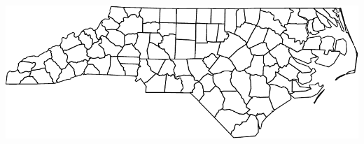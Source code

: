 \documentclass[11pt,ignorenonframetext,]{beamer}
\newenvironment{Shaded}{}{}
\newcommand{\KeywordTok}[1]{\textcolor[rgb]{0.00,0.44,0.13}{\textbf{#1}}}
\newcommand{\NormalTok}[1]{#1}
\newcommand{\OperatorTok}[1]{\textcolor[rgb]{0.40,0.40,0.40}{#1}}
\newcommand{\StringTok}[1]{\textcolor[rgb]{0.25,0.44,0.63}{#1}}
\let\oldShaded\Shaded
\let\endoldShaded\endShaded
\renewenvironment{Shaded}{\footnotesize\begin{spacing}{0.9}\oldShaded}{\endoldShaded\end{spacing}}
\let\oldverbatim\verbatim
\let\endoldverbatim\endverbatim
\newcommand{\scriptoutput}{
  \renewenvironment{Shaded}{\scriptsize\begin{spacing}{0.9}\oldShaded}{\endoldShaded\end{spacing}}
  \renewenvironment{verbatim}{\scriptsize\begin{spacing}{0.9}\oldverbatim}{\endoldverbatim\end{spacing}}
}
\begin{document}
\begin{frame}[fragile,t]{}
\protect\hypertarget{section-2}{}

\scriptoutput

\begin{Shaded}
\end{Shaded}

\begin{center}\includegraphics[width=\textwidth]{Lec16_files/figure-beamer/unnamed-chunk-22-1} \end{center}

\end{frame}
\end{document}
